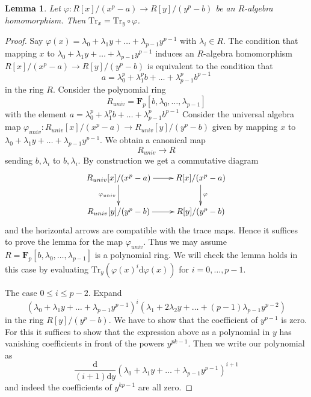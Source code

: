 \documentclass{stacks-project}
\theoremstyle{plain}
\newtheorem{lemma}[subsection]{Lemma}
\theoremstyle{definition}
\theoremstyle{remark}
\numberwithin{equation}{subsection}
\begin{document}
\begin{lemma}
\label{lemma-trace-well-defined}
Let $\varphi : R[x]/(x^p - a) \to R[y]/(y^p - b)$ be an $R$-algebra
homomorphism. Then $\text{Tr}_x = \text{Tr}_y \circ \varphi$.
\end{lemma}

\begin{proof}
Say $\varphi(x) = \lambda_0 + \lambda_1 y + \ldots + \lambda_{p - 1}y^{p - 1}$
with $\lambda_i \in R$. The condition that mapping $x$ to
$\lambda_0 + \lambda_1 y + \ldots + \lambda_{p - 1}y^{p - 1}$
induces an $R$-algebra homomorphism $R[x]/(x^p - a) \to R[y]/(y^p - b)$
is equivalent to the condition that
$$
a = \lambda_0^p + \lambda_1^p b + \ldots + \lambda_{p - 1}^pb^{p - 1}
$$
in the ring $R$. Consider the polynomial ring
$$
R_{univ} = \mathbf{F}_p[b, \lambda_0, \ldots, \lambda_{p - 1}]
$$
with the element
$a = \lambda_0^p + \lambda_1^p b + \ldots + \lambda_{p - 1}^pb^{p - 1}$
Consider the universal algebra map
$\varphi_{univ} : R_{univ}[x]/(x^p - a) \to R_{univ}[y]/(y^p - b)$
given by mapping $x$ to
$\lambda_0 + \lambda_1 y + \ldots + \lambda_{p - 1}y^{p - 1}$.
We obtain a canonical map
$$
R_{univ} \longrightarrow R
$$
sending $b, \lambda_i$ to $b, \lambda_i$. By construction we get a
commutative diagram
$$
\xymatrix{
R_{univ}[x]/(x^p - a) \ar[r] \ar[d]_{\varphi_{univ}} &
R[x]/(x^p - a) \ar[d]^\varphi \\
R_{univ}[y]/(y^p - b) \ar[r] & R[y]/(y^p - b)
}
$$
and the horizontal arrows are compatible with the trace maps. Hence it
suffices to prove the lemma for the map $\varphi_{univ}$. Thus we may
assume $R = \mathbf{F}_p[b, \lambda_0, \ldots, \lambda_{p - 1}]$
is a polynomial ring. We will check the lemma holds in this case
by evaluating
$\text{Tr}_y(\varphi(x)^i\text{d}\varphi(x))$ for $i = 0 , \ldots, p - 1$.

\medskip\noindent
The case $0 \leq i \leq p - 2$. Expand
$$
(\lambda_0 + \lambda_1 y + \ldots + \lambda_{p - 1}y^{p - 1})^i
(\lambda_1 + 2 \lambda_2 y + \ldots + (p - 1)\lambda_{p - 1}y^{p - 2})
$$
in the ring $R[y]/(y^p - b)$. We have to show that the coefficient
of $y^{p - 1}$ is zero. For this it suffices to show that
the expression above as a polynomial in $y$ has vanishing
coefficients in front of the powers $y^{pk - 1}$.
Then we write our polynomial as
$$
\frac{\text{d}}{(i + 1)\text{d}y}
(\lambda_0 + \lambda_1 y + \ldots + \lambda_{p - 1}y^{p - 1})^{i + 1}
$$
and indeed the coefficients of $y^{kp - 1}$ are all zero.


\end{proof}
\end{document}
